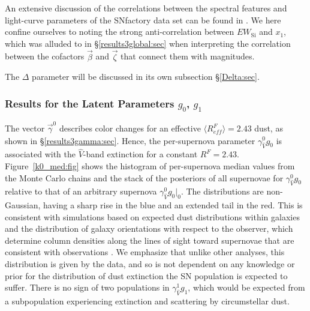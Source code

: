 \documentclass[trackchanges]{aastex62}   	%
\begin{document}
An extensive discussion of the correlations between the spectral features  and light-curve parameters of the SNfactory data
set can be found in \citet{chotard:thesis, leget:thesis, 2017Chotard}. 
We here confine ourselves to noting the strong anti-correlation between $EW_{\mathrm{Si}}$ and $x_1$, which was alluded
to in \S\ref{results3global:sec} when interpreting the correlation between the cofactors $\vec{\beta}$ and $\vec{\zeta}$ that connect them with magnitudes.


The $\Delta$ parameter will be discussed in its own subsection \S\ref{Delta:sec}.

\subsubsection{Results for the Latent  Parameters $g_0$, $g_1$}
\label{g0g1:sec}
The vector
$\vec{\gamma}^0$ describes color changes for an effective $\langle R^F_{\mathit{eff}}\rangle=2.43$ dust, as shown 
in  \S\ref{results3gamma:sec}.
Hence, the per-supernova parameter $\gamma^0_{\hat{V}} g_0$ is associated with the $\hat{V}$-band
extinction for a constant $R^F=2.43$.
Figure~\ref{k0_med:fig} shows the histogram of
per-supernova
median values
from the Monte Carlo chains
and the  stack of the posteriors of all supernovae  for $\gamma^0_{\hat{V}} g_0$ 
relative to that of an arbitrary supernova  $\gamma^0_{\hat{V}} g_0|_0$.
The distributions are non-Gaussian, having a sharp rise in the blue and an extended tail in the red.  This is consistent
with
simulations based on expected dust distributions
within galaxies and the distribution of galaxy orientations with respect to the observer,
which determine column densities along the lines of sight toward supernovae that are consistent with observations
\citep{1998ApJ...502..177H, 2007ApJ...659..122J}.  
We emphasize that unlike other analyses,
this distribution is given by the data, and so is not dependent on any knowledge or prior
for the distribution of dust extinction the SN population is expected to suffer. 
There is no sign of two populations in $\gamma^1_{\hat{V}} g_1$, which would be expected from a subpopulation
experiencing extinction and scattering by circumstellar dust.
\end{document}
